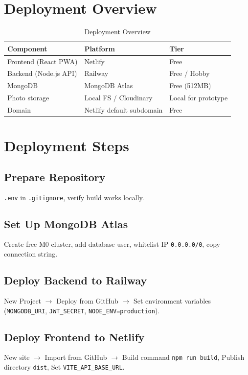 
\section{Deployment Overview}
\begin{table}[H]
\centering
\caption{Deployment Overview}
\label{tab:deployment}
\begin{tabularx}{\textwidth}{@{}lXl@{}}
\toprule
Component & Platform & Tier \\
\midrule
Frontend (React PWA) & Netlify & Free \\
Backend (Node.js API) & Railway & Free / Hobby \\
MongoDB & MongoDB Atlas & Free (512MB) \\
Photo storage & Local FS / Cloudinary & Local for prototype \\
Domain & Netlify default subdomain & Free \\
\bottomrule
\end{tabularx}
\end{table}

\section{Deployment Steps}

\subsection{Prepare Repository}
\texttt{.env} in \texttt{.gitignore}, verify build works locally.

\subsection{Set Up MongoDB Atlas}
Create free M0 cluster, add database user, whitelist IP \texttt{0.0.0.0/0}, copy connection string.

\subsection{Deploy Backend to Railway}
New Project $\rightarrow$ Deploy from GitHub $\rightarrow$ Set environment variables (\texttt{MONGODB\_URI}, \texttt{JWT\_SECRET}, \texttt{NODE\_ENV=production}).

\subsection{Deploy Frontend to Netlify}
New site $\rightarrow$ Import from GitHub $\rightarrow$ Build command \texttt{npm run build}, Publish directory \texttt{dist}, Set \texttt{VITE\_API\_BASE\_URL}.

